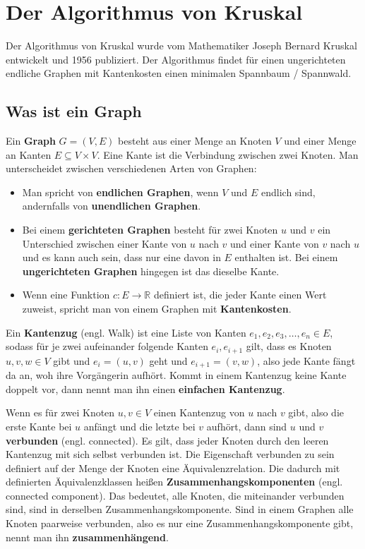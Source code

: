\section{Der Algorithmus von Kruskal}
Der Algorithmus von Kruskal wurde vom Mathematiker Joseph Bernard Kruskal entwickelt und 1956 publiziert\cite{kruskal_article}.
Der Algorithmus findet für einen ungerichteten endliche Graphen mit Kantenkosten einen minimalen Spannbaum / Spannwald.

\subsection{Was ist ein Graph}
Ein \textbf{Graph} $G = (V, E)$ besteht aus einer Menge an Knoten $V$ und einer Menge an Kanten $E \subseteq V \times V$. Eine Kante ist die Verbindung zwischen zwei Knoten. 
Man unterscheidet zwischen verschiedenen Arten von Graphen:
\begin{itemize}
  \item Man spricht von \textbf{endlichen Graphen}, wenn $V$ und $E$ endlich sind, andernfalls von \textbf{unendlichen Graphen}.
  \item Bei einem \textbf{gerichteten Graphen} besteht für zwei Knoten $u$ und $v$ ein Unterschied zwischen einer Kante von $u$ nach $v$ und einer Kante von $v$ nach $u$ und es kann auch sein,
  dass nur eine davon in $E$ enthalten ist. Bei einem \textbf{ungerichteten Graphen} hingegen ist das dieselbe Kante.
  \item Wenn eine Funktion $c : E \rightarrow \mathbb{R}$ definiert ist, die jeder Kante einen Wert zuweist, spricht man von einem Graphen mit \textbf{Kantenkosten}.
\end{itemize}
Ein \textbf{Kantenzug} (engl. Walk) ist eine Liste von Kanten $e_1, e_2, e_3, \dots, e_n \in E$, sodass für je zwei aufeinander folgende Kanten $e_i, e_{i+1}$ gilt, 
dass es Knoten $u, v, w \in V$ gibt und $e_i = (u,v)$ geht und $e_{i+1}=(v,w)$, also jede Kante fängt da an, woh ihre Vorgängerin aufhört.
Kommt in einem Kantenzug keine Kante doppelt vor, dann nennt man ihn einen \textbf{einfachen Kantenzug}.

Wenn es für zwei Knoten $u, v \in V$ einen Kantenzug von $u$ nach $v$ gibt, also die erste Kante bei $u$ anfängt und die letzte bei $v$ aufhört,
dann sind $u$ und $v$ \textbf{verbunden} (engl. connected).
Es gilt, dass jeder Knoten durch den leeren Kantenzug mit sich selbst verbunden ist.
Die Eigenschaft verbunden zu sein definiert auf der Menge der Knoten eine Äquivalenzrelation.
Die dadurch mit definierten Äquivalenzklassen heißen \textbf{Zusammenhangskomponenten} (engl. connected component).
Das bedeutet, alle Knoten, die miteinander verbunden sind, sind in derselben Zusammenhangskomponente.
Sind in einem Graphen alle Knoten paarweise verbunden, also es nur eine Zusammenhangskomponente gibt, nennt man ihn \textbf{zusammenhängend}.

